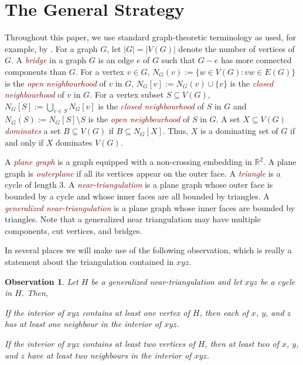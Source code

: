 \documentclass[a4paper,UKenglish,cleveref, autoref, thm-restate]{lipics-v2021}
\newtheorem{obs}{Observation}
\newcommand{\defin}[1]{\emph{\textcolor{Maroon}{#1}}}
\begin{document}
\section{The General Strategy}
\label{strategy}

Throughout this paper, we use standard graph-theoretic terminology as used, for example, by \citet{diestel:graph}.
For a graph $G$, let $|G|=|V(G)|$ denote the number of vertices of $G$.  A \defin{bridge} in a graph $G$ is an edge $e$ of $G$ such that $G-e$ has more connected components than $G$.  For a vertex $v\in G$, $N_G(v):=\{w\in V(G):vw\in E(G)\}$ is the \defin{open neighbourhood} of $v$ in $G$,  $N_G[v]:=N_G(v)\cup\{v\}$ is the \defin{closed neighbourhood} of $v$ in $G$.  For a vertex subset $S\subseteq V(G)$, $N_G[S]:=\bigcup_{v\in S} N_{G}[v]$ is the \defin{closed neighbourhood} of $S$ in $G$ and $N_G(S):=N_G[S]\setminus S$ is the \defin{open neighbourhood} of $S$ in $G$.  A set $X\subseteq V(G)$ \defin{dominates} a set $B\subseteq V(G)$ if $B\subseteq N_G[X]$.  Thus, $X$ is a dominating set of $G$ if and only if $X$ dominates $V(G)$.

A \defin{plane graph} is a graph equipped with a non-crossing embedding in $\mathbb{R}^2$.  A plane graph is \defin{outerplane} if all its vertices appear on the outer face.  A \defin{triangle} is a cycle of length $3$. A \defin{near-triangulation} is a plane graph whose outer face is bounded by a cycle and whose inner faces are all bounded by triangles.  A \defin{generalized near-triangulation} is a plane graph whose inner faces are bounded by triangles. Note that a generalized near triangulation may have multiple components, cut vertices, and bridges.

In several places we will make use of the following observation, which is really a statement about the triangulation contained in $xyz$.
\begin{obs}\label{useful_little_guy}
  Let $H$ be a generalized near-triangulation and let $xyz$ be a cycle in $H$.  Then,
  \begin{compactenum}
    \item If the interior of $xyz$ contains at least one vertex of $H$, then each of $x$, $y$, and $z$ has at least one neighbour in the interior of $xyz$.

    \item If the interior of $xyz$ contains at least two vertices of $H$, then at least two of $x$, $y$, and $z$ have at least two neighbours in the interior of $xyz$.
  \end{compactenum}
\end{obs}
\end{document}
